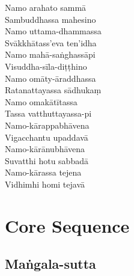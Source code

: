 
\begin{paritta}
  Namo arahato sammā\\
  Sambuddhassa mahesino\\
  Namo uttama-dhammassa\\
  Svākkhātass'eva ten'idha\\
  Namo mahā-saṅghassāpi\\
  Visuddha-sīla-diṭṭhino\\
  Namo omāty-āraddhassa\\
  Ratanattayassa sādhukaṃ\\
  Namo omakātītassa\\
  Tassa vatthuttayassa-pi\\
  Namo-kārappabhāvena\\
  Vigacchantu upaddavā\\
  Namo-kārānubhāvena\\
  Suvatthi hotu sabbadā\\
  Namo-kārassa tejena\\
  Vidhimhi homi tejavā
\end{paritta}


\section{Core Sequence}

\subsection{Maṅgala-sutta}
\label{asevana}


